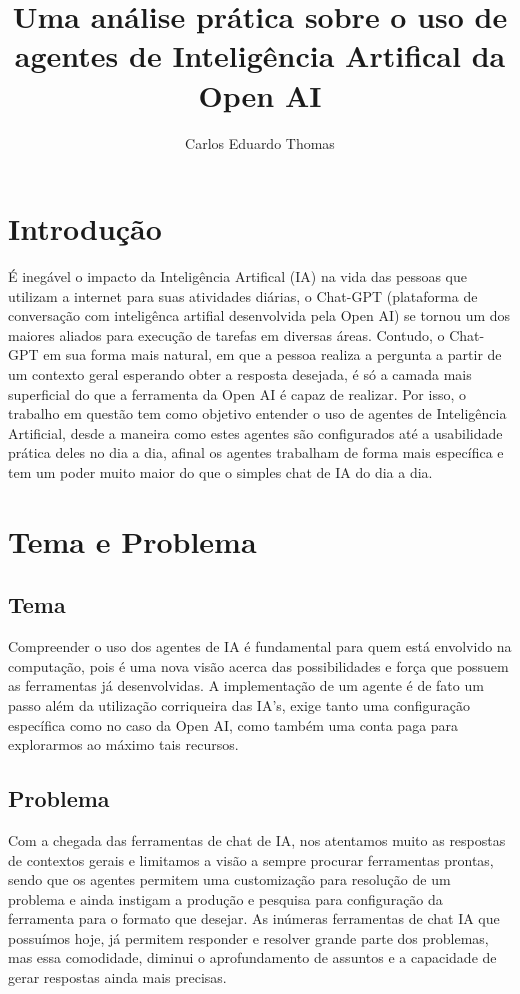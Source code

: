 \documentclass{article}
\title{Uma análise prática sobre o uso de agentes de Inteligência Artifical da Open AI}
\author{Carlos Eduardo Thomas}
\begin{document}
\maketitle

\section{Introdução}

\hspace{0.5cm}É inegável o impacto da Inteligência Artifical (IA) na vida das pessoas que utilizam a internet para suas atividades diárias, o Chat-GPT (plataforma de conversação com inteligênca artifial desenvolvida pela Open AI) se tornou um dos maiores aliados para execução de tarefas em diversas áreas. Contudo, o Chat-GPT em sua forma mais natural, em que a pessoa realiza a pergunta a partir de um contexto geral esperando obter a resposta desejada, é só a camada mais superficial do que a ferramenta da Open AI é capaz de realizar. Por isso, o trabalho em questão tem como objetivo entender o uso de agentes de Inteligência Artificial, desde a maneira como estes agentes são configurados até a usabilidade prática deles no dia a dia, afinal os agentes trabalham de forma mais específica e tem um poder muito maior do que o simples chat de IA do dia a dia.

\section{Tema e Problema}

\subsection{Tema}

\hspace{0.5cm}Compreender o uso dos agentes de IA é fundamental para quem está envolvido na computação, pois é uma nova visão acerca das possibilidades e força que possuem as ferramentas já desenvolvidas. A implementação de um agente é de fato um passo além da utilização corriqueira das IA's, exige tanto uma configuração específica como no caso da Open AI, como também uma conta paga para explorarmos ao máximo tais recursos.

\subsection{Problema}

\hspace{0.5cm}Com a chegada das ferramentas de chat de IA, nos atentamos muito as respostas de contextos gerais e limitamos a visão a sempre procurar ferramentas prontas, sendo que os agentes permitem uma customização para resolução de um problema e ainda instigam a produção e pesquisa para configuração da ferramenta para o formato que desejar. As inúmeras ferramentas de chat IA que possuímos hoje, já permitem responder e resolver grande parte dos problemas, mas essa comodidade, diminui o aprofundamento de assuntos e a capacidade de gerar respostas ainda mais precisas.
\end{document}
